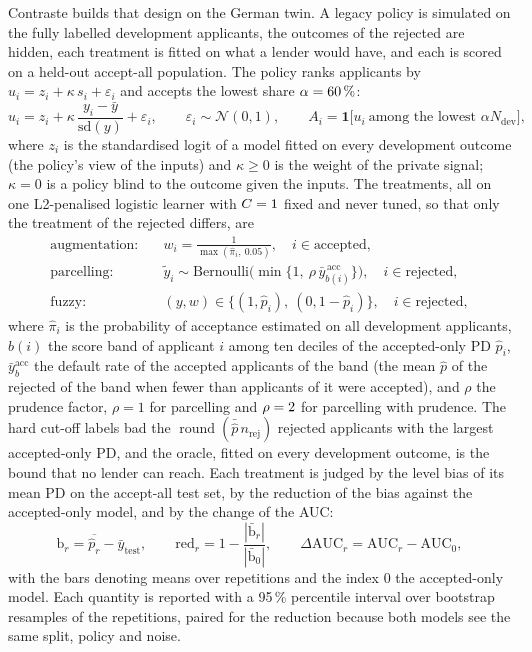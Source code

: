 Contraste builds that design on the German twin. A legacy policy is simulated on the fully labelled development applicants, the
outcomes of the rejected are hidden, each treatment is fitted on what a lender would have, and each is scored on a held-out
accept-all population. The policy ranks applicants by $u_i=z_i+\kappa\,s_i+\varepsilon_i$ and accepts the lowest share
$\alpha=60{}\,\%$:
\begin{equation}
u_i=z_i+\kappa\,\frac{y_i-\bar y}{\mathrm{sd}(y)}+\varepsilon_i,\qquad \varepsilon_i\sim\mathcal N(0,1),\qquad
A_i=\mathbf 1\big[u_i\ \text{among the lowest }\alpha N_{\mathrm{dev}}\big],
\label{eq:cs-policy}
\end{equation}
where $z_i$ is the standardised logit of a model fitted on every development outcome (the policy's view of the inputs) and
$\kappa\ge0$ is the weight of the private signal; $\kappa=0$ is a policy blind to the outcome given the inputs. The treatments,
all on one L2-penalised logistic learner with $C=1{}$ fixed and never tuned, so that only the treatment of the rejected
differs, are
\begin{align}
\text{augmentation:}\quad & w_i=\frac{1}{\max(\hat\pi_i,\ 0.05)},\quad i\in\text{accepted},\label{eq:cs-aug}\\
\text{parcelling:}\quad & \tilde y_i\sim\mathrm{Bernoulli}\big(\min\{1,\ \rho\,\bar y_{b(i)}^{\,\mathrm{acc}}\}\big),\quad i\in\text{rejected},\label{eq:cs-parcel}\\
\text{fuzzy:}\quad & (y,w)\in\{(1,\hat p_i),\ (0,1-\hat p_i)\},\quad i\in\text{rejected},\label{eq:cs-fuzzy}
\end{align}
where $\hat\pi_i$ is the probability of acceptance estimated on all development applicants, $b(i)$ the score band of applicant $i$
among ten deciles of the accepted-only PD $\hat p_i$, $\bar y_b^{\mathrm{acc}}$ the default rate of the accepted applicants of the band
(the mean $\hat p$ of the rejected of the band when fewer than \csRjMinAcc{} applicants of it were accepted), and $\rho$ the prudence
factor, $\rho=1$ for parcelling and $\rho=2{}$ for parcelling with prudence. The hard cut-off labels bad the
$\operatorname{round}(\bar{\hat p}\,n_{\mathrm{rej}})$ rejected applicants with the largest accepted-only PD, and the oracle, fitted
on every development outcome, is the bound that no lender can reach. Each treatment is judged by the level bias of its mean PD on
the accept-all test set, by the reduction of the bias against the accepted-only model, and by the change of the AUC:
\begin{equation}
\mathrm{b}_r=\overline{\hat p_r}-\bar y_{\mathrm{test}},\qquad
\mathrm{red}_r=1-\frac{|\bar{\mathrm b}_r|}{|\bar{\mathrm b}_0|},\qquad
\Delta\mathrm{AUC}_r=\mathrm{AUC}_r-\mathrm{AUC}_0,
\label{eq:cs-bias}
\end{equation}
with the bars denoting means over repetitions and the index $0$ the accepted-only model. Each quantity is reported with a 95\,\%
percentile interval over \csRjBoot{} bootstrap resamples of the \csRjReps{} repetitions, paired for the reduction because both
models see the same split, policy and noise.

